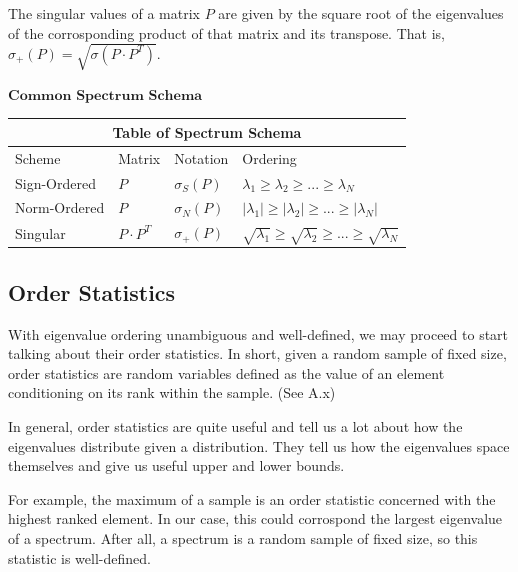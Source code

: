 \begin{definition}
The singular values of a matrix $P$ are given by the square root of the eigenvalues of the corrosponding product of that matrix and its transpose. That is, $\sigma_+(P) = \sqrt{\sigma(P \cdot P^T)}$.
\end{definition}

\begin{center}
$\textbf{Common Spectrum Schema}$
\end{center}

\begin{tabular}{ |p{3cm}|p{2cm}|p{3cm}|p{5cm}|  }
 \hline
 \multicolumn{4}{|c|}{Table of Spectrum Schema} \\
 \hline
 Scheme & Matrix & Notation & Ordering \\
 \hline
 Sign-Ordered & $P$ & $\sigma_{S}(P)$ & $\lambda_1 \geq \lambda_2 \geq ... \geq \lambda_N$ \\
 Norm-Ordered & $P$ & $\sigma_{N}(P)$ & $|\lambda_1| \geq |\lambda_2| \geq ... \geq |\lambda_N|$ \\
 Singular & $P \cdot P^T$ & $\sigma_{+}(P)$ & $\sqrt{\lambda_1} \geq \sqrt{\lambda_2} \geq ... \geq \sqrt{\lambda_N}$ \\
 \hline
\end{tabular}


\subsection{Order Statistics}

With eigenvalue ordering unambiguous and well-defined, we may proceed to start talking about their order statistics. In short, given a random sample of fixed size, order statistics are random variables defined as the value of an element conditioning on its rank within the sample. (See A.x)

In general, order statistics are quite useful and tell us a lot about how the eigenvalues distribute given a distribution. They tell us how the eigenvalues space themselves and give us useful upper and lower bounds. 

For example, the maximum of a sample is an order statistic concerned with the highest ranked element. In our case, this could corrospond the largest eigenvalue of a spectrum. After all, a spectrum is a random sample of fixed size, so this statistic is well-defined. 

